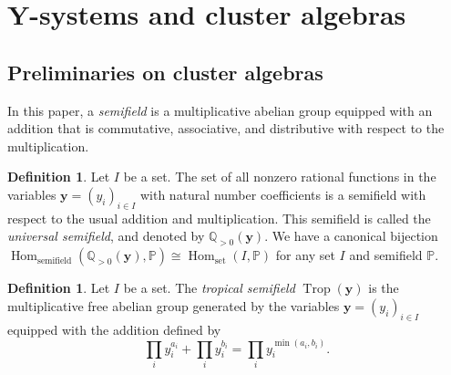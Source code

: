 \documentclass[pdftex]{sigma}
\numberwithin{equation}{section}
\theoremstyle{definition}
\newtheorem{Definition}[Theorem]{Definition}
\DeclareMathOperator{\Hom}{Hom}
\DeclareMathOperator{\Trop}{Trop}
\begin{document}
\section[Y-systems and cluster algebras]{$\boldsymbol{ Y}$-systems and cluster algebras}
\subsection{Preliminaries on cluster algebras}
\label{section:Y from cluster}
In this paper, a \emph{semifield} is a multiplicative abelian group equipped with an addition that is commutative,
associative, and distributive with respect to the multiplication.

\begin{Definition}
 Let $I$ be a set.
 The set of all nonzero rational functions in the variables $\boldsymbol{y} = (y_i)_{i \in I}$ with
 natural number coefficients is a semifield with respect to the usual addition and multiplication.
 This semifield is called the \emph{universal semifield}, and denoted by $\mathbb{Q}_{>0} (\boldsymbol{y})$.
 We have a canonical bijection
 $\Hom_{\mathrm{semifield}} (\mathbb{Q}_{>0} (\boldsymbol{y}), \mathbb{P}) \cong \Hom_{\mathrm{set}} (I, \mathbb{P})$
 for any set $I$ and semifield $\mathbb{P}$.
\end{Definition}

\begin{Definition}
 Let $I$ be a set.
 The \emph{tropical semifield} $\Trop(\boldsymbol{y})$ is the multiplicative free abelian group
 generated by the variables $\boldsymbol{y} = (y_i)_{i \in I}$ equipped with the addition defined by
 \begin{equation*}
 \prod_i y_i^{a_i} +
 \prod_i y_i^{b_i} =
 \prod_i y_i^{\min(a_i,b_i)}.
 \end{equation*}
\end{Definition}
\end{document}
